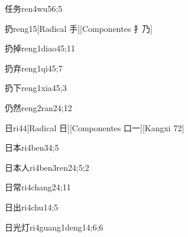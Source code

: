 \begin{verbete}{任务}{ren4wu5}{6;5}
\end{verbete}

\begin{verbete}{扔}{reng1}{5}[Radical 手][Componentes 扌乃]
\end{verbete}

\begin{verbete}{扔掉}{reng1diao4}{5;11}
\end{verbete}

\begin{verbete}{扔弃}{reng1qi4}{5;7}
\end{verbete}

\begin{verbete}{扔下}{reng1xia4}{5;3}
\end{verbete}

\begin{verbete}{仍然}{reng2ran2}{4;12}
\end{verbete}

\begin{verbete}{日}{ri4}{4}[Radical 日][Componentes 口一][Kangxi 72]
\end{verbete}

\begin{verbete}{日本}{ri4ben3}{4;5}
\end{verbete}

\begin{verbete}{日本人}{ri4ben3ren2}{4;5;2}
\end{verbete}

\begin{verbete}{日常}{ri4chang2}{4;11}
\end{verbete}

\begin{verbete}{日出}{ri4chu1}{4;5}
\end{verbete}

\begin{verbete}{日光灯}{ri4guang1deng1}{4;6;6}
\end{verbete}

